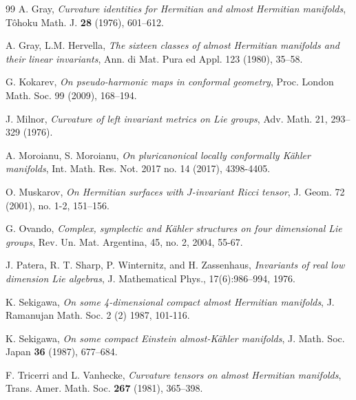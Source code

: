 \documentclass{amsart}
\begin{document}
\begin{thebibliography}{99}
 A. Gray, {\it Curvature identities for Hermitian and almost
Hermitian manifolds}, T{\^o}hoku Math. J. {\bf 28} (1976), 601--612.

 A. Gray, L.M. Hervella, {\it The sixteen classes of almost Hermitian manifolds and their linear invariants}, Ann. di Mat. Pura ed Appl. 123 (1980), 35--58.

  G. Kokarev, {\it On pseudo-harmonic maps in conformal geometry}, Proc. London Math. Soc. 99 (2009), 168--194.

 J. Milnor, {\it  Curvature of left invariant metrics on Lie groups}, Adv. Math. 21, 293–329 (1976).

 A. Moroianu, S. Moroianu, {\it On pluricanonical locally conformally Kähler manifolds}, Int. Math. Res. Not. 2017 no. 14 (2017), 4398-4405.

 O. Muskarov, {\it On Hermitian surfaces with $J$-invariant Ricci tensor}, J. Geom. 72 (2001), no. 1-2, 151–156.

 G. Ovando, {\it Complex, symplectic and K\"ahler structures on four dimensional Lie groups}, Rev. Un. Mat. Argentina, 45, no. 2, 2004, 55-67.

 J. Patera, R. T. Sharp, P. Winternitz, and H. Zassenhaus, {\it Invariants of real low dimension Lie algebras}, J.
Mathematical Phys., 17(6):986--994, 1976.

 K. Sekigawa, {\it On some 4-dimensional compact almost Hermitian manifolds}, J. Ramanujan Math. Soc. 2 (2) 1987, 101-116.


 K. Sekigawa, {\it On some compact Einstein almost-K\"ahler
manifolds}, J. Math. Soc. Japan {\bf 36} (1987), 677--684.

 F. Tricerri and L. Vanhecke, {\it Curvature tensors on almost
Hermitian manifolds},
Trans. Amer. Math. Soc. {\bf 267} (1981), 365--398.


\end{thebibliography}
\end{document}
